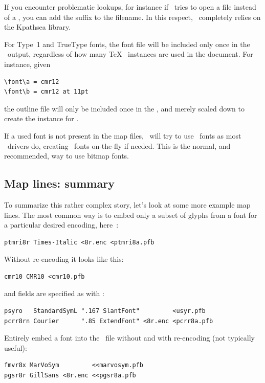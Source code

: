 \documentclass{pdftexmanual}
\begin{document}
If you encounter problematic lookups, for instance if \PDFTEX\ tries
to open a  file instead of a , you can add
the suffix to the filename.  In this respect, \PDFTEX\ completely relies
on the Kpathsea library.

For Type~1 and TrueType fonts, the font file will be included only once
in the \PDF\ output, regardless of how many \TeX\  instances
are used in the document. For instance, given

\begin{verbatim}
\font\a = cmr12
\font\b = cmr12 at 11pt
\end{verbatim}

the outline file  will only be included once in the
\PDF, and merely scaled down to create the instance for .

If a used font is not present in the map files, \PDFTEX\ will try to use
\PK~fonts as most \DVI\ drivers do, creating \PK~fonts on-the-fly if
needed. This is the normal, and recommended, way to use bitmap fonts.

\subsection{Map lines: summary}

To summarize this rather complex story, let's look at some more example
map lines. The most common way is to embed only a subset of glyphs from
a font for a particular desired encoding, here~:

\begin{verbatim}
ptmri8r Times-Italic <8r.enc <ptmri8a.pfb
\end{verbatim}

Without re-encoding it looks like this:

\begin{verbatim}
cmr10 CMR10 <cmr10.pfb
\end{verbatim}

 and  fields are specified as with
:

\begin{verbatim}
psyro   StandardSymL ".167 SlantFont"         <usyr.pfb
pcrr8rn Courier      ".85 ExtendFont" <8r.enc <pcrr8a.pfb
\end{verbatim}

Entirely embed a font into the \PDF\ file without and with re-encoding
(not typically useful):

\begin{verbatim}
fmvr8x MarVoSym         <<marvosym.pfb
pgsr8r GillSans <8r.enc <<pgsr8a.pfb
\end{verbatim}
\end{document}

